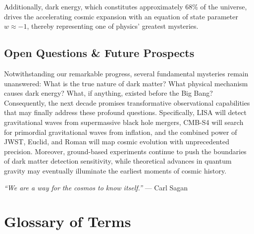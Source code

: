 \documentclass[11pt,a4paper]{article}
\begin{document}
Additionally, dark energy, which constitutes approximately 68\% of the universe, drives the accelerating cosmic expansion with an equation of state parameter $w \approx -1$, thereby representing one of physics' greatest mysteries.

\subsection{Open Questions \& Future Prospects}

Notwithstanding our remarkable progress, several fundamental mysteries remain unanswered: What is the true nature of dark matter? What physical mechanism causes dark energy? What, if anything, existed before the Big Bang? Consequently, the next decade promises transformative observational capabilities that may finally address these profound questions. Specifically, LISA will detect gravitational waves from supermassive black hole mergers, CMB-S4 will search for primordial gravitational waves from inflation, and the combined power of JWST, Euclid, and Roman will map cosmic evolution with unprecedented precision. Moreover, ground-based experiments continue to push the boundaries of dark matter detection sensitivity, while theoretical advances in quantum gravity may eventually illuminate the earliest moments of cosmic history.

\begin{center}
\begin{tcolorbox}[colback=lightcosmic, colframe=cosmicpurple, width=0.85\textwidth, arc=3mm]
    \centering
    \textit{``We are a way for the cosmos to know itself.''} --- Carl Sagan
\end{tcolorbox}
\end{center}

\newpage

\section{Glossary of Terms}
\label{sec:glossary}
\end{document}
